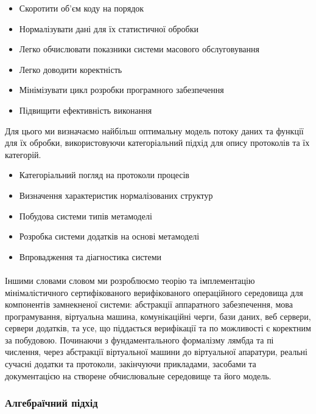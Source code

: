 \documentclass[11pt,oneside]{article}
\begin{document}
\begin{itemize}
   \item Скоротити об’єм коду на порядок
   \item Нормалізувати дані для їх статистичної обробки
   \item Легко обчислювати показники системи масового обслуговування
   \item Легко доводити коректність
   \item Мінімізувати цикл розробки програмного забезпечення
   \item Підвищити ефективність виконання
\end{itemize}

  Для цього ми визначаємо найбільш оптимальну модель потоку даних та функції для їх обробки,
  використовуючи категоріальний підхід для опису протоколів та їх категорій.

\begin{itemize}
   \item Категоріальний погляд на протоколи процесів
   \item Визначення характеристик нормалізованих структур
   \item Побудова системи типів метамоделі
   \item Розробка системи додатків на основі метамоделі
   \item Впровадження та діагностика системи
\end{itemize}

   \paragraph{}
   Іншими словами словом ми розроблюємо теорію та імплементацію мінімалістичного
   сертифікованого верифікованого операційного середовища для компонентів замнекненої системи:
   абстракції аппаратного забезпечення, мова програмування, віртуальна машина, комунікаційні
   черги, бази даних, веб сервери, сервери додатків, та усе, що піддається верифікації та по
   можливості є коректним за побудовою. Починаючи з фундаментального формалізму лямбда та пі числення,
   через абстракції віртуальної машини до віртуальної апаратури, реальні сучасні додатки та протоколи,
   закінчуючи прикладами, засобами та документацією на створене обчислювальне середовище та його модель.\\

\newpage
   \subsubsection*{Алгебраїчний підхід}
\end{document}
